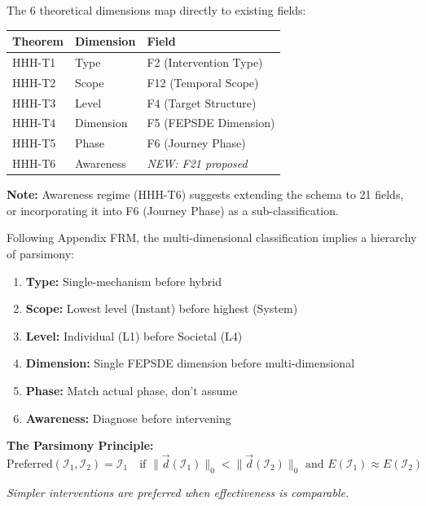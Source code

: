 \begin{tcolorbox}[colback=orange!5!white, colframe=orange!75!black,
    title=\textbf{Field Mapping: 6D Classification to 20-Field Schema}]

The 6 theoretical dimensions map directly to existing fields:

\begin{center}
\begin{tabular}{@{}lll@{}}
\toprule
\textbf{Theorem} & \textbf{Dimension} & \textbf{Field} \\
\midrule
HHH-T1 & Type & F2 (Intervention Type) \\
HHH-T2 & Scope & F12 (Temporal Scope) \\
HHH-T3 & Level & F4 (Target Structure) \\
HHH-T4 & Dimension & F5 (FEPSDE Dimension) \\
HHH-T5 & Phase & F6 (Journey Phase) \\
HHH-T6 & Awareness & \textit{NEW: F21 proposed} \\
\bottomrule
\end{tabular}
\end{center}

\textbf{Note:} Awareness regime (HHH-T6) suggests extending the schema to 21 fields, or incorporating it into F6 (Journey Phase) as a sub-classification.

\end{tcolorbox}

\begin{tcolorbox}[colback=red!5!white, colframe=red!75!black,
    title=\textbf{Methodological Note: XVIII Exclusion Principle for All Dimensions}]

Following Appendix FRM, the multi-dimensional classification implies a hierarchy of parsimony:

\begin{enumerate}[nosep]
    \item \textbf{Type:} Single-mechanism before hybrid
    \item \textbf{Scope:} Lowest level (Instant) before highest (System)
    \item \textbf{Level:} Individual (L1) before Societal (L4)
    \item \textbf{Dimension:} Single FEPSDE dimension before multi-dimensional
    \item \textbf{Phase:} Match actual phase, don't assume
    \item \textbf{Awareness:} Diagnose before intervening
\end{enumerate}

\textbf{The Parsimony Principle:}
\begin{equation}
\text{Preferred}(\mathcal{I}_1, \mathcal{I}_2) = \mathcal{I}_1 \quad \text{if } \|\vec{d}(\mathcal{I}_1)\|_0 < \|\vec{d}(\mathcal{I}_2)\|_0 \text{ and } E(\mathcal{I}_1) \approx E(\mathcal{I}_2)
\end{equation}

\textit{Simpler interventions are preferred when effectiveness is comparable.}
\end{tcolorbox}


